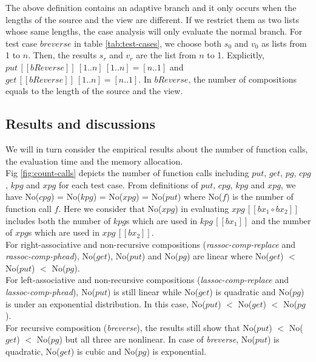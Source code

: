 \documentclass[runningheads]{llncs}
\newcommand{\putbx}[3]{put \, [\![#1]\!] \ #2 \ #3}
\newcommand{\getbx}[2]{get \, [\![#1]\!] \ #2}
\newcommand{\kpginline}[1]{kpg \, [\![#1]\!]}
\newcommand{\xpginline}[1]{xpg \, [\![#1]\!]}
\begin{document}
The above definition contains an adaptive branch and it only occurs when the lengths of the source and the view are different. If we restrict them as two lists whose same lengths, the case analysis will only evaluate the normal branch. For test case $breverse$ in table \ref{tab:test-cases}, we choose both $s_0$ and $v_0$ as lists from 1 to $n$. Then, the results $s_r$ and $v_r$ are the list from $n$ to 1. Explicitly, $\putbx{bReverse}{[1..n]}{[1..n]} = [n..1]$ and $\getbx{bReverse}{[1..n]} = [n..1]$. In $bReverse$, the number of compositions equals to the length of the source and the view.

\subsection{Results and discussions}

We will in turn consider the empirical results about the number of function calls, the evaluation time and the memory allocation.\\

Fig \ref{fig:count-calls} depicts the number of function calls including $put$, $get$, $pg$, $cpg$, $kpg$ and $xpg$ for each test case. From definitions of $put$, $cpg$, $kpg$ and $xpg$, we have No($cpg$) = No($kpg$) = No($xpg$) = No($put$) where No($f$) is the number of function call $f$. Here we consider that No($xpg$) in evaluating $\xpginline{bx_1 \circ bx_2}$ includes both the number of $kpg$s which are used in $\kpginline{bx_1}$ and the number of $xpg$s which are used in $\xpginline{bx_2}$.\\

For right-associative and non-recursive compositions (\textit{rassoc-comp-replace} and \textit{rassoc-comp-phead}), No($get$), No($put$) and No($pg$) are linear where No($get$) $<$ No($put$) $<$ No($pg$).\\

For left-associative and non-recursive compositions (\textit{lassoc-comp-replace} and \textit{lassoc-comp-phead}), No($put$) is still linear while No($get$) is quadratic and No($pg$) is under an exponential distribution. In this case, No($put$) $<$ No($get$) $<$ No($pg$).\\

For recursive composition (\textit{breverse}), the results still show that No($put$) $<$ No($get$) $<$ No($pg$) but all three are nonlinear. In case of \textit{breverse}, No($put$) is quadratic, No($get$) is cubic and No($pg$) is exponential.\\
\end{document}
